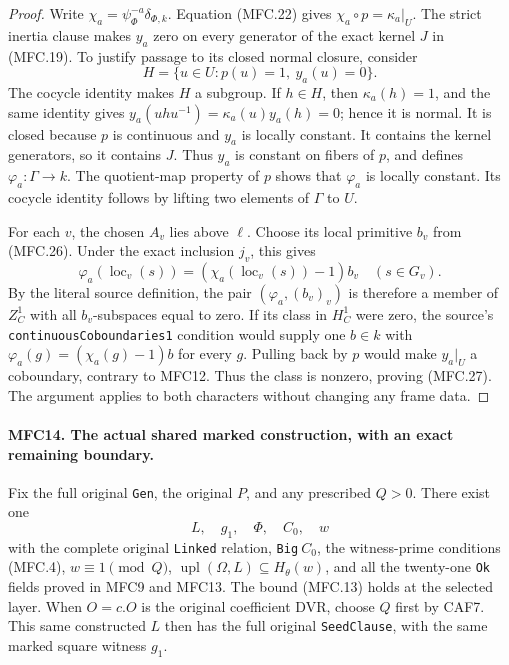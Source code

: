 \documentclass[11pt,a4paper]{article}
\numberwithin{equation}{section}
\theoremstyle{remark}\newtheorem{remark}[theorem]{Remark}
\begin{document}
\begin{proof}
Write \(\chi_a=\psi_\Phi^{-a}\delta_{\Phi,k}\).
Equation (MFC.22) gives \(\chi_a\circ p=\kappa_a|_U\).
The strict inertia clause makes \(y_a\) zero on every
generator of the exact kernel \(J\) in (MFC.19).
To justify passage to its closed normal closure, consider
\[
                    H=\{u\in U:p(u)=1,\ y_a(u)=0\}.
\]
The cocycle identity makes \(H\) a subgroup.  If \(h\in H\),
then \(\kappa_a(h)=1\), and the same identity gives
\(y_a(uhu^{-1})=\kappa_a(u)y_a(h)=0\); hence it is normal.
It is closed because \(p\) is continuous and \(y_a\) is
locally constant.  It contains the kernel generators, so it
contains \(J\).  Thus \(y_a\) is constant on fibers of
\(p\), and defines \(\varphi_a:\Gamma\to k\).
The quotient-map property of \(p\) shows that
\(\varphi_a\) is locally constant.  Its cocycle identity
follows by lifting two elements of \(\Gamma\) to \(U\).

For each \(v\), the chosen \(A_v\) lies above \(\ell\).
Choose its local primitive \(b_v\) from (MFC.26).  Under
the exact inclusion \(j_v\), this gives
\[
 \varphi_a(\operatorname{loc}_v(s))
      =(\chi_a(\operatorname{loc}_v(s))-1)b_v
                                  \quad(s\in G_v).        \tag{MFC.28}
\]
By the literal source definition, the pair
\((\varphi_a,(b_v)_v)\) is therefore a member of
\(Z^1_C\) with all \(b_v\)-subspaces equal to zero.
If its class in \(H^1_C\) were zero, the source's
\texttt{continuous\allowbreak Coboundaries1} condition would supply one
\(b\in k\) with
\(\varphi_a(g)=(\chi_a(g)-1)b\) for every \(g\).
Pulling back by \(p\) would make \(y_a|_U\) a coboundary,
contrary to MFC12.  Thus the class is nonzero, proving (MFC.27).
The argument applies to both characters without changing any
frame data.
\end{proof}

\paragraph{MFC14. The actual shared marked construction, with an exact remaining boundary.}
\label{claim:MFC14}
Fix the full original \texttt{Gen}, the original \(P\), and
any prescribed \(Q>0\).  There exist one
\[
                  L,\quad g_1,\quad\Phi,\quad C_0,\quad w
\]
with the complete original \texttt{Linked} relation,
\texttt{Big}\(\ C_0\), the witness-prime conditions
(MFC.4), \(w\equiv1\pmod Q\),
\(\operatorname{upl}(\Omega,L)\subseteq H_\theta(w)\),
and all the twenty-one \texttt{Ok} fields proved in MFC9
and MFC13.  The bound (MFC.13) holds at the selected layer.
When \(O=c.O\) is the original coefficient DVR, choose
\(Q\) first by CAF7.  This same constructed \(L\) then
has the full original \texttt{Seed\allowbreak Clause}, with the same
marked square witness \(g_1\).
\end{document}

